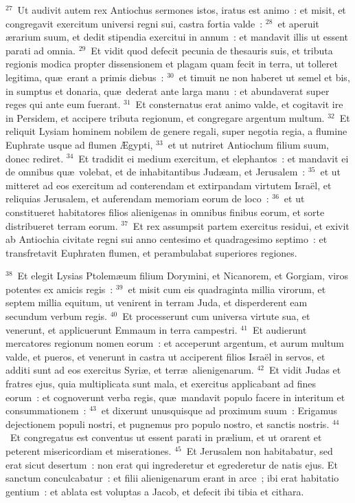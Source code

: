 ${}^{27}$~Ut audivit autem rex Antiochus sermones istos, iratus est animo~: et misit, et congregavit exercitum universi regni sui, castra fortia valde~:
${}^{28}$~et aperuit \ae rarium suum, et dedit stipendia exercitui in annum~: et mandavit illis ut essent parati ad omnia.
${}^{29}$~Et vidit quod defecit pecunia de thesauris suis, et tributa regionis modica propter dissensionem et plagam quam fecit in terra, ut tolleret legitima, qu\ae\ erant a primis diebus~:
${}^{30}$~et timuit ne non haberet ut semel et bis, in sumptus et donaria, qu\ae\ dederat ante larga manu~: et abundaverat super reges qui ante eum fuerant.
${}^{31}$~Et consternatus erat animo valde, et cogitavit ire in Persidem, et accipere tributa regionum, et congregare argentum multum.
${}^{32}$~Et reliquit Lysiam hominem nobilem de genere regali, super negotia regia, a flumine Euphrate usque ad flumen \AE gypti,
${}^{33}$~et ut nutriret Antiochum filium suum, donec rediret.
${}^{34}$~Et tradidit ei medium exercitum, et elephantos~: et mandavit ei de omnibus qu\ae\ volebat, et de inhabitantibus Jud\ae am, et Jerusalem~:
${}^{35}$~et ut mitteret ad eos exercitum ad conterendam et extirpandam virtutem Isra\"el, et reliquias Jerusalem, et auferendam memoriam eorum de loco~:
${}^{36}$~et ut constitueret habitatores filios alienigenas in omnibus finibus eorum, et sorte distribueret terram eorum.
${}^{37}$~Et rex assumpsit partem exercitus residui, et exivit ab Antiochia civitate regni sui anno centesimo et quadragesimo septimo~: et transfretavit Euphraten flumen, et perambulabat superiores regiones.


${}^{38}$~Et elegit Lysias Ptolem\ae um filium Dorymini, et Nicanorem, et Gorgiam, viros potentes ex amicis regis~:
${}^{39}$~et misit cum eis quadraginta millia virorum, et septem millia equitum, ut venirent in terram Juda, et disperderent eam secundum verbum regis.
${}^{40}$~Et processerunt cum universa virtute sua, et venerunt, et applicuerunt Emmaum in terra campestri.
${}^{41}$~Et audierunt mercatores regionum nomen eorum~: et acceperunt argentum, et aurum multum valde, et pueros, et venerunt in castra ut acciperent filios Isra\"el in servos, et additi sunt ad eos exercitus Syri\ae , et terr\ae\ alienigenarum.
${}^{42}$~Et vidit Judas et fratres ejus, quia multiplicata sunt mala, et exercitus applicabant ad fines eorum~: et cognoverunt verba regis, qu\ae\ mandavit populo facere in interitum et consummationem~:
${}^{43}$~et dixerunt unusquisque ad proximum suum~: Erigamus dejectionem populi nostri, et pugnemus pro populo nostro, et sanctis nostris.
${}^{44}$~Et congregatus est conventus ut essent parati in pr\ae lium, et ut orarent et peterent misericordiam et miserationes.
${}^{45}$~Et Jerusalem non habitabatur, sed erat sicut desertum~: non erat qui ingrederetur et egrederetur de natis ejus. Et sanctum conculcabatur~: et filii alienigenarum erant in arce~; ibi erat habitatio gentium~: et ablata est voluptas a Jacob, et defecit ibi tibia et cithara.


